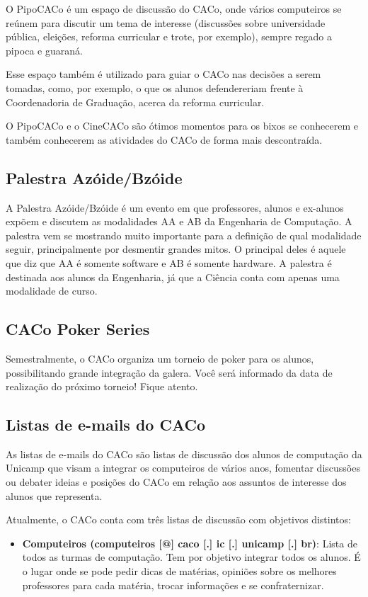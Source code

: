 O PipoCACo é um espaço de discussão do CACo, onde vários computeiros se reúnem
para discutir um tema de interesse (discussões sobre universidade pública,
eleições, reforma curricular e trote, por exemplo), sempre regado a pipoca
e guaraná.

Esse espaço também é utilizado para guiar o CACo nas decisões a serem tomadas,
como, por exemplo, o que os alunos defendereriam frente à Coordenadoria de
Graduação, acerca da reforma curricular.

O PipoCACo e o CineCACo são ótimos momentos para os bixos se conhecerem e também
conhecerem as atividades do CACo de forma mais descontraída.

\subsection{Palestra Azóide/Bzóide}

A Palestra Azóide/Bzóide é um evento em que professores, alunos e ex-alunos expõem
e discutem as modalidades AA e AB da Engenharia de Computação. A palestra vem se mostrando muito importante
para a definição de qual modalidade seguir, principalmente por desmentir grandes
mitos. O principal deles é aquele que diz que AA é somente software e AB
é somente hardware. A palestra é destinada aos alunos da Engenharia,
já que a Ciência conta com apenas uma modalidade de curso.

\subsection{CACo Poker Series}

Semestralmente, o CACo organiza um torneio de poker para os alunos,
possibilitando grande integração da galera. Você será informado da data de
realização do próximo torneio! Fique atento.

\subsection{Listas de e-mails do CACo}

As listas de e-mails do CACo são listas de discussão dos alunos de computação da
Unicamp que visam a integrar os computeiros de vários anos, fomentar discussões
ou debater ideias e posições do CACo em relação aos assuntos de interesse dos
alunos que representa.

Atualmente, o CACo conta com três listas de discussão com objetivos distintos:

\begin{itemize}
\item  \textbf{Computeiros (computeiros [@] caco [.] ic [.] unicamp [.] br)}: Lista de todos as turmas de computação. Tem por objetivo integrar todos os alunos. É o lugar onde se pode pedir dicas de matérias, opiniões sobre os melhores professores para cada matéria, trocar informações e se confraternizar.
\end{itemize}


